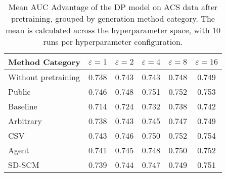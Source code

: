 \begin{table}[h!]
    \centering
    \caption{Mean AUC Advantage of the DP model on ACS data after pretraining, grouped by generation method category. The mean is calculated across the hyperparameter space, with 10 runs per hyperparameter configuration.}
    \label{tab:epsilon_comparison}
    \begin{tabular}{lccccc}
    \toprule
    Method Category & $\varepsilon=1$ & $\varepsilon=2$ & $\varepsilon=4$ & $\varepsilon=8$ & $\varepsilon=16$ \\
    \midrule
    Without pretraining & 0.738 & 0.743 & 0.743 & 0.748 & 0.749 \\
    \arrayrulecolor{black!50!}\midrule
    Public & \cellcolor{gold!30}0.746 & \cellcolor{gold!30}0.748 & \cellcolor{gold!30}0.751 & \cellcolor{gold!30}0.752 & \cellcolor{silver!30}0.753 \\
    \arrayrulecolor{black!50!}\midrule
    Baseline & 0.714 & 0.724 & 0.732 & 0.738 & 0.742 \\
    \arrayrulecolor{black!50!}\midrule
    Arbitrary & 0.738 & 0.743 & 0.745 & 0.747 & 0.749 \\
    \arrayrulecolor{black!50!}\midrule
    CSV & \cellcolor{silver!30}0.743 & \cellcolor{silver!30}0.746 & \cellcolor{silver!30}0.750 & \cellcolor{gold!30}0.752 & \cellcolor{gold!30}0.754 \\
    Agent & \cellcolor{bronze!30}0.741 & \cellcolor{bronze!30}0.745 & \cellcolor{bronze!30}0.748 & \cellcolor{silver!30}0.750 & \cellcolor{bronze!30}0.752 \\
    SD-SCM & 0.739 & 0.744 & 0.747 & \cellcolor{bronze!30}0.749 & 0.751 \\
    \bottomrule
    \end{tabular}
\end{table}